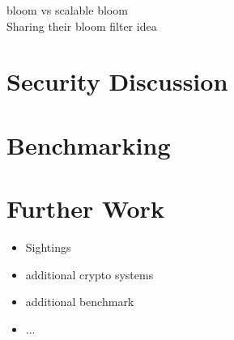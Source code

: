 \documentclass{eplmastersthesis}
\begin{document}
bloom vs scalable bloom \\

Sharing their bloom filter idea \\

\section{Security Discussion}

\section{Benchmarking}

\section{Further Work}
\begin{itemize}
\item Sightings
\item additional crypto systems
\item additional benchmark
\item ...
\end{itemize}


\newpage


\newpage

\backcoverpage
\end{document}
